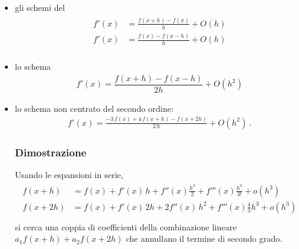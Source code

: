 \documentclass[letterpaper,10pt,english]{jupyterBook}
\begin{document}
\begin{itemize}
\item {} 
\sphinxAtStartPar
gli schemi del 
\begin{equation*}
\begin{split}\begin{aligned}
    f'(x) & = \frac{f(x+h) - f(x)}{h} + O(h) \\
    f'(x) & = \frac{f(x) - f(x-h)}{h} + O(h) \\
  \end{aligned}\end{split}
\end{equation*}
\item {} 
\sphinxAtStartPar
lo schema 
\begin{equation*}
\begin{split}f'(x) = \dfrac{f(x+h) - f(x-h)}{2 h} + O(h^2) \end{split}
\end{equation*}
\item {} 
\sphinxAtStartPar
lo schema non centrato del secondo ordine:
\begin{equation*}
\begin{split}f'(x) = \frac{-3 \, f(x) + 4 \, f(x+h) - f(x+2h)}{2 \, h} + O(h^2) \ .\end{split}
\end{equation*}\subsubsection*{Dimostrazione}

\sphinxAtStartPar
Usando le espansioni in serie,
\begin{equation*}
\begin{split}\begin{aligned}
  f(x + h) & = f(x) + f'(x) \, h + f''(x) \frac{h^2}{2} + f'''(x) \frac{h^3}{3!} + o(h^3) \\
  f(x + 2h) & = f(x) + f'(x) \, 2 h + 2 f''(x) \, h^2 + f'''(x) \frac{4}{3} h^3 + o(h^3) \\
\end{aligned}\end{split}
\end{equation*}
\sphinxAtStartPar
si cerca una coppia di coefficienti della combinazione lineare \(a_1 f(x+h) + a_2 f(x+2h)\) che annullano il termine di secondo grado.


\end{itemize}
\end{document}
